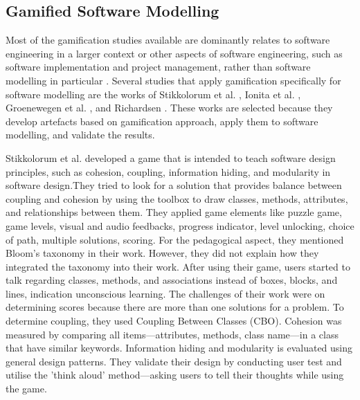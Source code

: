 \documentclass[a4paper]{Report}
\begin{document}
\subsection{Gamified Software Modelling}
Most of the gamification studies available are dominantly relates to software engineering in a larger context or other aspects of software engineering, such as software implementation and project management, rather than software modelling in particular \cite{Pedreira2015}. Several studies that apply gamification specifically for software modelling are the works of Stikkolorum et al. \cite{Stikkolorum2014}, Ionita et al. \cite{Ionita2015}, Groenewegen et al. \cite{Groenewegen2010}, and Richardsen \cite{Richardsen2014}. These works are selected because they develop artefacts based on gamification approach, apply them to software modelling, and validate the results. 

Stikkolorum et al. \cite{Stikkolorum2014} developed a game that is intended to teach software design principles, such as cohesion, coupling, information hiding, and modularity in software design.They tried to look for a solution that provides balance between coupling and cohesion by using the toolbox to draw classes, methods, attributes, and relationships between them. They applied game elements like puzzle game, game levels, visual and audio feedbacks, progress indicator, level unlocking, choice of path, multiple solutions, scoring. For the pedagogical aspect, they mentioned Bloom’s taxonomy in their work. However, they did not explain how they integrated the taxonomy into their work. After using their game, users started to talk regarding classes, methods, and associations instead of boxes, blocks, and lines, indication unconscious learning. The challenges of their work were on determining scores because there are more than one solutions for a problem. To determine coupling, they used Coupling Between Classes (CBO). Cohesion was measured by comparing all items—attributes, methods, class name—in a class that have similar keywords. Information hiding and modularity is evaluated using general design patterns. They validate their design by conducting user test and utilise the 'think aloud' method—asking users to tell their thoughts while using the game. 
\end{document}

